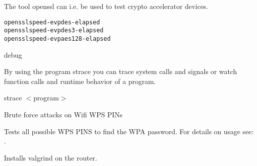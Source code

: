\begin{description}


    The tool openssl can i.e. be used to test crypto accelerator devices.

\begin{example}
\begin{alltt}
openssl speed -evp des -elapsed
openssl speed -evp des3 -elapsed
openssl speed -evp aes128 -elapsed
\end{alltt}
\end{example}

 debug

    By using the program strace you can trace system calls and signals or watch
    function calls and runtime behavior of a program.

    strace $<$program$>$

 Brute force attacks on Wifi WPS PINs

    Tests all possible WPS PINS to find the WPA password. For details on usage 
    see: \\
    .

        Installs valgrind on the router.

\end{description}

